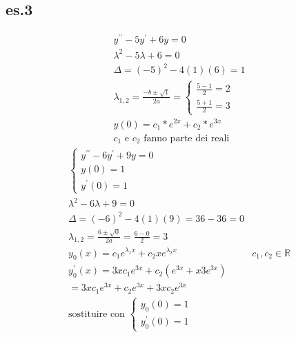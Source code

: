 \documentclass{article}
\begin{document}
\subsection{es.3}
\begin{equation*}
	\begin{matrix}
		y^{\prime\prime}-5y^\prime+6y=0\\
		\lambda^2-5\lambda+6=0\\
		\Delta=(-5)^2-4(1)(6)=1\\
		\lambda_{1,2}=\frac{-b\pm\sqrt{1}}{2a}=\begin{cases}
			\frac{5-1}{2}=2\\
			\frac{5+1}{2}=3
		\end{cases}\\
		y(0)=c_1*e^{2x}+c_2*e^{3x}\\
		c_1\text{ e } c_2 \text{ fanno parte dei reali}
	\end{matrix}
\end{equation*}
\begin{equation*}
	\begin{matrix}
		\begin{cases}
			y^{\prime\prime}-6y^{\prime}+9y=0\\
			y(0)=1\\
			y^\prime(0)=1
		\end{cases}\\
		\lambda^2-6\lambda+9=0\\
		\Delta=(-6)^2-4(1)(9)=36-36=0\\
		\lambda_{1,2}=\frac{6\pm\sqrt{0}}{2a}=\frac{6-0}{2}=3\\
		y_0(x)=c_1e^{\lambda_1x}+c_2xe^{\lambda_2x} & c_1,c_2\in \mathds{R}\\
		y_0^\prime(x)=3xc_1e^{3x}+c_2(e^{3x}+x3e^{3x})\\
		=3xc_1e^{3x}+c_2e^{3x}+3xc_2e^{3x}\\
		\text{sostituire con } \begin{cases}
			y_0(0)=1\\
			y_0^\prime(0)=1
		\end{cases}
	\end{matrix}
\end{equation*}
\end{document}
